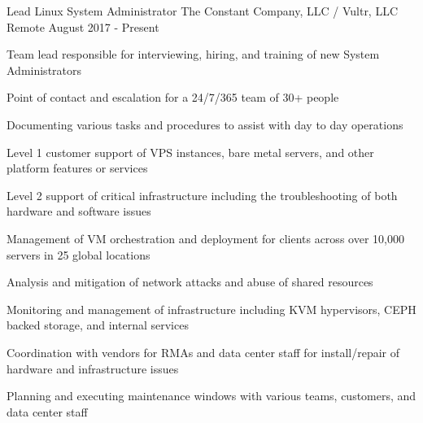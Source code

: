 
\begin{cventries}

	\cventry
	{Lead Linux System Administrator}
	{The Constant Company, LLC / Vultr, LLC}
	{Remote}
	{August 2017 - Present}
	{
		\begin{cvitems}
		\item {Team lead responsible for interviewing, hiring, and training of new System Administrators}
  		\item {Point of contact and escalation for a 24/7/365 team of 30+ people} 
		\item {Documenting various tasks and procedures to assist with day to day operations}
		\item {Level 1 customer support of VPS instances, bare metal servers, and other platform features or services}
		\item {Level 2 support of critical infrastructure including the troubleshooting of both hardware and software issues}
		\item {Management of VM orchestration and deployment for clients across over 10,000 servers in 25 global locations}
		\item {Analysis and mitigation of network attacks and abuse of shared resources}
		\item {Monitoring and management of infrastructure including KVM hypervisors,  CEPH backed storage, and internal services}
		\item {Coordination with vendors for RMAs and data center staff for install/repair of hardware and infrastructure issues}
		\item {Planning and executing maintenance windows with various teams, customers, and data center staff}
		\end{cvitems}
	}



\end{cventries}

